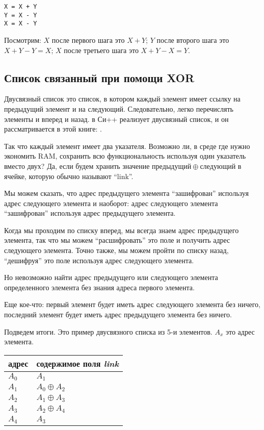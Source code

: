 \begin{lstlisting}
X = X + Y
Y = X - Y
X = X - Y
\end{lstlisting}

Посмотрим:
$X$ после первого шага это $X+Y$;
$Y$ после второго шага это $X+Y-Y=X$;
$X$ после третьего шага это $X+Y-X=Y$.

\subsection{Список связанный при помощи XOR}

Двусвязный список это список, в котором каждый элемент имеет ссылку на предыдущий элемент и на следующий.
Следовательно, легко перечислять элементы и вперед и назад.
 в Си++ реализует двусвязный список, и он рассматривается в этой книге: .

Так что каждый элемент имеет два указателя.
Возможно ли, в среде где нужно экономить \ac{RAM}, сохранить всю функциональность используя один указатель
вместо двух?
Да, если будем хранить значение $предыдущий \oplus следующий$ в ячейке, которую обычно называют ``link''.

Мы можем сказать, что адрес предыдущего элемента ``зашифрован'' используя адрес следующего элемента и наоборот:
адрес следующего элемента ``зашифрован'' используя адрес предыдущего элемента.

Когда мы проходим по списку вперед, мы всегда знаем адрес предыдущего элемента, так что мы можем ``расшифровать'' это поле
и получить адрес следующего элемента.
Точно также, мы можем пройти по списку назад, ``дешифруя'' это поле используя адрес следующего элемента.

Но невозможно найти адрес предыдущего или следующего элемента определенного элемента без знания адреса первого элемента.

Еще кое-что: первый элемент будет иметь адрес следующего элемента без ничего,
последний элемент будет иметь адрес предыдущего элемента без ничего.

Подведем итоги. Это пример двусвязного списка из 5-и элементов.
$A_x$ это адрес элемента.

\begin{center}
\begin{tabular}{ | l | l | }
	\hline
	\HeaderColor адрес & \HeaderColor содержимое поля \emph{link} \\
	\hline
	$A_0$ & $A_1$ \\
	\hline
	$A_1$ & $A_0 \oplus A_2$ \\
	\hline
	$A_2$ & $A_1 \oplus A_3$ \\
	\hline
	$A_3$ & $A_2 \oplus A_4$ \\
	\hline
	$A_4$ & $A_3$ \\
	\hline
\end{tabular}
\end{center}

